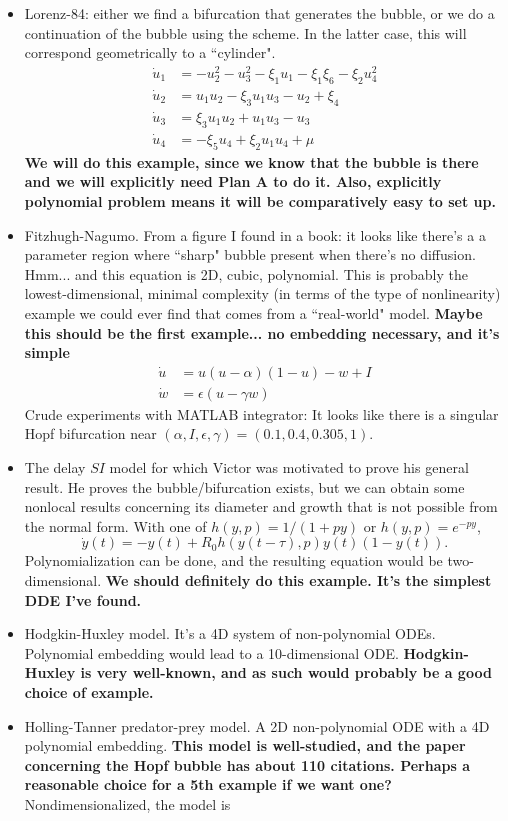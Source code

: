\documentclass[10pt]{article}
\begin{document}
\begin{itemize}
\item Lorenz-84: either we find a bifurcation that generates the bubble, or we do a continuation of the bubble using the scheme. In the latter case, this will correspond geometrically to a ``cylinder".
\begin{align*}
\dot u_1&=-u_2^2 - u_3^2 - \xi_1u_1 - \xi_1\xi_6 - \xi_2 u_4^2 \\ 
\dot u_2&=u_1u_2 - \xi_3u_1u_3-u_2+\xi_4\\
\dot u_3&=\xi_3u_1u_2 + u_1u_3 - u_3\\
\dot u_4&= -\xi_5u_4 + \xi_2u_1u_4 + \mu
\end{align*}
\textbf{We will do this example, since we know that the bubble is there and we will explicitly need Plan A to do it. Also, explicitly polynomial problem means it will be comparatively easy to set up.}
\item Fitzhugh-Nagumo. From a figure I found in a book: it looks like there's a a parameter region where ``sharp" bubble present when there's no diffusion. Hmm... and this equation is 2D, cubic, polynomial. This is probably the lowest-dimensional, minimal complexity (in terms of the type of nonlinearity) example we could ever find that comes from a ``real-world" model. \textbf{Maybe this should be the first example... no embedding necessary, and it's simple} 
\begin{align*}
\dot u&=u(u-\alpha)(1-u)-w+I\\
\dot w&=\epsilon(u-\gamma w)
\end{align*}
Crude experiments with MATLAB integrator: It looks like there is a singular Hopf bifurcation near $(\alpha,I,\epsilon,\gamma)=(0.1,0.4,0.305,1)$.
\item The delay $SI$ model for which Victor was motivated to prove his general result. He proves the bubble/bifurcation exists, but we can obtain some nonlocal results concerning its diameter and growth that is not possible from the normal form. With one of $h(y,p)=1/(1+py)$ or $h(y,p)=e^{-py}$,
$$\dot y(t) = -y(t) +R_0 h(y(t-\tau),p)y(t)(1-y(t)).$$ 
Polynomialization can be done, and the resulting equation would be two-dimensional. \textbf{We should definitely do this example. It's the simplest DDE I've found.}
\item Hodgkin-Huxley model. It's a 4D system of non-polynomial ODEs. Polynomial embedding would lead to a 10-dimensional ODE. \textbf{Hodgkin-Huxley is very well-known, and as such would probably be a good choice of example.}
\item Holling-Tanner predator-prey model. A 2D non-polynomial ODE with a 4D polynomial embedding. \textbf{This model is well-studied, and the paper concerning the Hopf bubble has about 110 citations. Perhaps a reasonable choice for a 5th example if we want one?} Nondimensionalized, the model is

\end{itemize}
\end{document}
